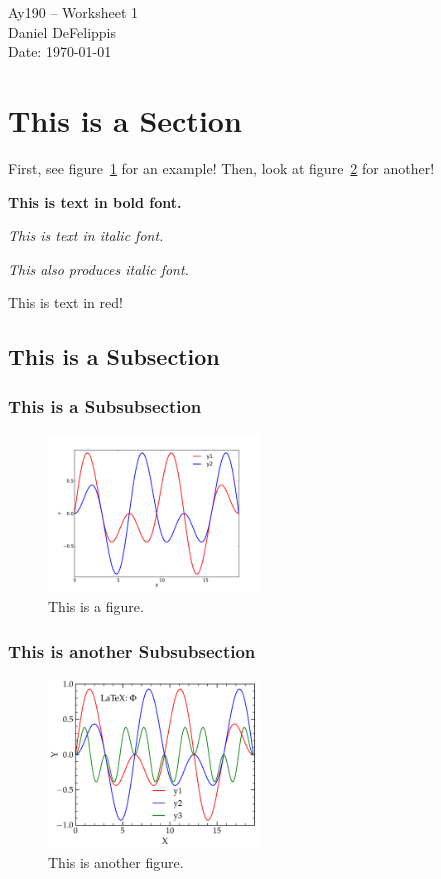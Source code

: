 \documentclass[11pt,letterpaper]{article}
\begin{document}
\begin{center}
\Large
Ay190 -- Worksheet 1\\
Daniel DeFelippis\\
Date: \today
\end{center}

\section{This is a Section}

First, see figure~\ref{fig:simpleplot} for an example!
Then, look at figure~\ref{fig:simpleplot2} for another!


{\bf This is text in bold font.}

\emph{This is text in italic font.}

{\it This also produces italic font.}

{\color{red} This is text in red!}

\subsection{This is a Subsection}

\subsubsection{This is a Subsubsection}

\begin{figure}[bth]
\centering
\includegraphics[width=0.5\textwidth]{simpleplot.pdf}
\caption{This is a figure.}
\label{fig:simpleplot}
\end{figure}

\subsubsection{This is another Subsubsection}

\begin{figure}[bth]
\centering
\includegraphics[width=0.5\textwidth]{simpleplot2.pdf}
\caption{This is another figure.}
\label{fig:simpleplot2}
\end{figure}
\end{document}
